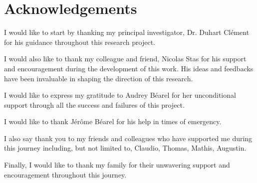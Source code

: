 \vspace*{\fill}

\section*{Acknowledgements}

I would like to start by thanking my principal investigator, Dr. Duhart Clément for his guidance throughout this research project.

I would also like to thank my colleague and friend, Nicolas Stas for his support and encouragement during the development of this work. His ideas and feedbacks have been invaluable in shaping the direction of this research.

I would like to express my gratitude to Audrey Béarel for her unconditional support through all the success and failures of this project.

I would like to thank Jérôme Béarel for his help in times of emergency.

I also say thank you to my friends and colleagues who have supported me during this journey including, but not limited to, Claudio, Thomas, Mathis, Augustin.

Finally, I would like to thank my family for their unwavering support and encouragement throughout this journey.

\vspace*{\fill}
